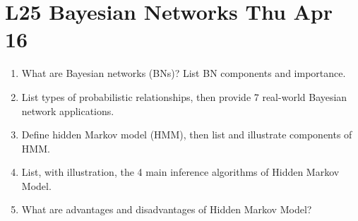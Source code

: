 \documentclass[12pt]{article}
\newenvironment{QandA}{\begin{enumerate}[label=\bfseries\arabic*.]\bfseries}
{\end{enumerate}}
\newenvironment{answered}{\par\normalfont\color{Sepia}}{}
\begin{document}
\section*{L25 Bayesian Networks \textemdash{} Thu Apr 16}
\begin{QandA}
    \item What are Bayesian networks (BNs)? List BN components and importance.
    \begin{answered}
    \end{answered}

    \item List types of probabilistic relationships, then provide 7 real-world Bayesian network applications.
    \begin{answered}
    \end{answered}

    \item Define hidden Markov model (HMM), then list and illustrate components of HMM.
    \begin{answered}
    \end{answered}

    \item List, with illustration, the 4 main inference algorithms of Hidden Markov Model.
    \begin{answered}
    \end{answered}

    \item What are advantages and disadvantages of Hidden Markov Model?
    \begin{answered}
    \end{answered}

\end{QandA}
\end{document}

